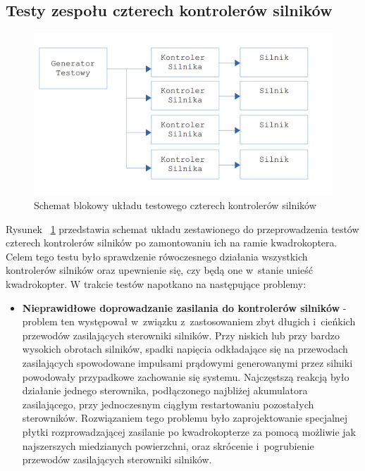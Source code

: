 \subsection{Testy zespołu czterech kontrolerów silników}


\begin{figure}[H]
	\centering
	\includegraphics[scale=0.2]{Pictures/TestyKontroleraSilnikow_x4.png}
	\caption[Schemat blokowy układu testowego czterech kontrolerów silników]{Schemat blokowy układu testowego czterech kontrolerów silników}
	\label{fig:MotorController_test_four}
\end{figure}

Rysunek ~\ref{fig:MotorController_test_four} przedstawia schemat układu zestawionego do przeprowadzenia testów czterech kontrolerów silników po zamontowaniu ich na ramie kwadrokoptera. Celem tego testu było sprawdzenie rówoczesnego działania wszystkich kontrolerów silników oraz upewnienie się, czy będą one w~stanie unieść kwadrokopter. W trakcie testów napotkano na następujące problemy:
\begin{itemize}
	\item \textbf{Nieprawidłowe doprowadzanie zasilania do kontrolerów silników} - problem ten występował w~związku z~zastosowaniem zbyt długich i~cieńkich przewodów zasilających sterowniki silników. Przy niskich lub przy bardzo wysokich obrotach silników, spadki napięcia odkładające się na przewodach zasilających spowodowane impulsami prądowymi generowanymi przez silniki powodowały przypadkowe zachowanie się systemu. Najczęstszą reakcją było działanie jednego sterownika, podłączonego najbliżej akumulatora zasilającego, przy jednoczesnym ciągłym restartowaniu pozostałych sterowników. Rozwiązaniem tego problemu było zaprojektowanie specjalnej płytki rozprowadzającej zasilanie po kwadrokopterze za pomocą możliwie jak najszerszych miedzianych powierzchni, oraz skrócenie i~pogrubienie przewodów zasilających sterowniki silników.
\end{itemize}

